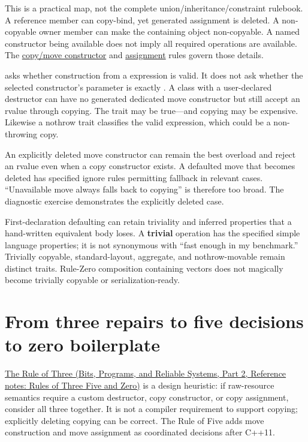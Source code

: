 This is a practical map, not the complete union/inheritance/constraint rulebook. A reference member can copy-bind, yet generated assignment is deleted. A non-copyable owner member can make the containing object non-copyable. A named constructor being available does not imply all required operations are available. The \href{https://eel.is/c++draft/class.copy.ctor}{copy/move constructor} and \href{https://eel.is/c++draft/class.copy.assign}{assignment} rules govern those details.

 asks whether construction from a  expression is valid. It does not ask whether the selected constructor's parameter is exactly . A class with a user-declared destructor can have no generated dedicated move constructor but still accept an rvalue through  copying. The trait may be true---and copying may be expensive. Likewise a nothrow trait classifies the valid expression, which could be a non-throwing copy.

An explicitly deleted move constructor can remain the best overload and reject an rvalue even when a copy constructor exists. A defaulted move that becomes deleted has specified ignore rules permitting fallback in relevant cases. ``Unavailable move always falls back to copying'' is therefore too broad. The diagnostic exercise demonstrates the explicitly deleted case.

First-declaration defaulting can retain triviality and inferred properties that a hand-written equivalent body loses. A \textbf{trivial} operation has the specified simple language properties; it is not synonymous with ``fast enough in my benchmark.'' Trivially copyable, standard-layout, aggregate, and nothrow-movable remain distinct traits. Rule-Zero composition containing vectors does not magically become trivially copyable or serialization-ready.

\section{From three repairs to five decisions to zero boilerplate}\label{05-engine-i-ch003-from-three-repairs-to-five-decisions-to-zero-boilerplate}

\hypertarget{05-engine-i-ch003-from-three-repairs-to-five-decisions-to-zero-boilerplate}{}

\href{../01-Bits-Programs-and-Reliable-Systems-P02/main.pdf\#nameddest=appendix-7679107d057e}{The Rule of Three (Bits, Programs, and Reliable Systems, Part 2, Reference notes: Rules of Three Five and Zero)} is a design heuristic: if raw-resource semantics require a custom destructor, copy constructor, or copy assignment, consider all three together. It is not a compiler requirement to support copying; explicitly deleting copying can be correct. The Rule of Five adds move construction and move assignment as coordinated decisions after C++11.

